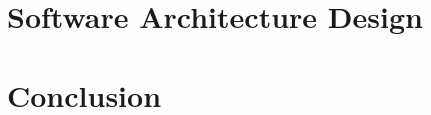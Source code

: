 \documentclass[12pt]{report}
\begin{document}
\chapter{Software Architecture Design}


\chapter{Conclusion}






\end{document}
